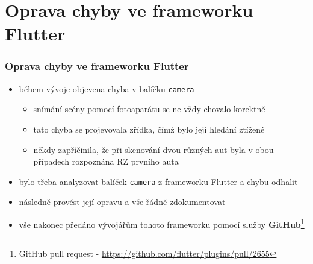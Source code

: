 \documentclass{beamer}
\begin{document}
\section{Oprava chyby ve frameworku Flutter}
\begin{frame}
\frametitle{Oprava chyby ve frameworku Flutter}
\begin{itemize}
    \item během vývoje objevena chyba v balíčku \texttt{camera}
    \begin{itemize}
        \item snímání scény pomocí fotoaparátu se ne vždy chovalo korektně
        \item tato chyba se projevovala zřídka, čímž bylo její hledání ztížené
        \item někdy zapříčinila, že při skenování dvou různých aut byla v obou případech rozpoznána RZ prvního auta
    \end{itemize}
    \item bylo třeba analyzovat balíček \texttt{camera} z frameworku Flutter a chybu odhalit
    \item následně provést její opravu a vše řádně zdokumentovat
    \item vše nakonec předáno vývojářům tohoto frameworku pomocí služby \textbf{GitHub}\footnote{GitHub pull request - \url{https://github.com/flutter/plugins/pull/2655}}
\end{itemize}
\end{frame}
\end{document}
